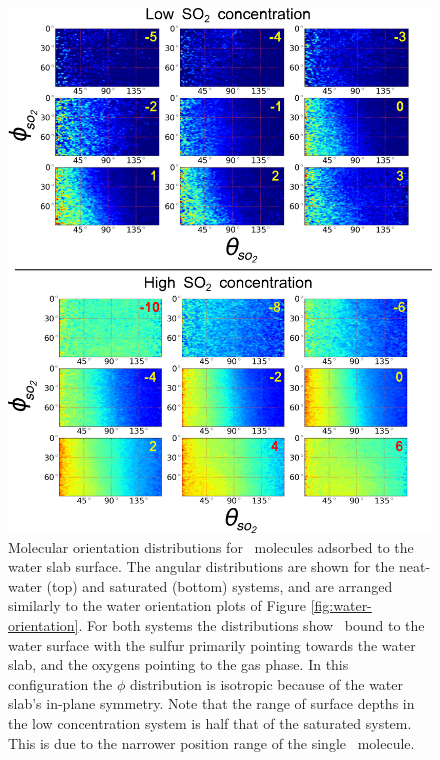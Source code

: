
\begin{figure}[h!]
	\begin{center}
		\includegraphics[scale=1.0]{images/so2-angles/theta-phi.png}
		\caption{Molecular orientation distributions for \suldiox~molecules adsorbed to the water slab surface. The angular distributions are shown for the neat-water (top) and saturated (bottom) systems, and are arranged similarly to the water orientation plots of Figure \ref{fig:water-orientation}. For both systems the distributions show \suldiox~bound to the water surface with the sulfur primarily pointing towards the water slab, and the oxygens pointing to the gas phase. In this configuration the $\phi$ distribution is isotropic because of the water slab's in-plane symmetry. Note that the range of surface depths in the low concentration system is half that of the saturated system. This is due to the narrower position range of the single \suldiox~molecule.}
		\label{fig:so2-orientation}
	\end{center}
\end{figure}
